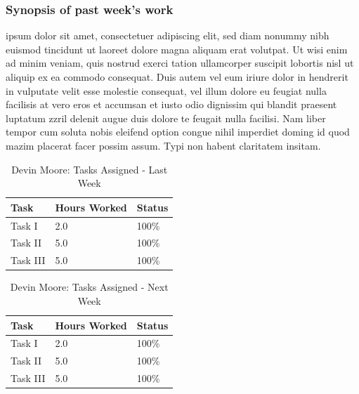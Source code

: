 \documentclass[12pt,journal]{IEEEtran}
\begin{document}
	\subsubsection*{Synopsis of past week's work}
	ipsum dolor sit amet, consectetuer adipiscing elit, sed diam nonummy nibh 
	euismod tincidunt ut laoreet dolore magna aliquam erat volutpat. Ut wisi enim ad minim veniam, quis 
	nostrud exerci tation ullamcorper suscipit lobortis nisl ut aliquip ex ea commodo consequat. Duis 
	autem vel eum iriure dolor in hendrerit in vulputate velit esse molestie consequat, vel illum dolore 
	eu feugiat nulla facilisis at vero eros et accumsan et iusto odio dignissim qui blandit praesent luptatum 
	zzril delenit augue duis dolore te feugait nulla facilisi. Nam liber tempor cum soluta nobis eleifend option 
	congue nihil imperdiet doming id quod mazim placerat facer possim assum. Typi non habent claritatem insitam.

	\begin{table}[H]
	\renewcommand{\arraystretch}{1.3}
		\caption{Devin Moore: Tasks Assigned - Last Week}
		\label{Summary of Devin Moore's activities: last week}
		\centering
		\begin{tabular}{p{5cm}|p{1cm}|p{1cm}}

		\hline
		\bfseries 	Task		 		                    & \bfseries Hours Worked	& \bfseries Status	\\
		\hline\hline
					      Task I 					 	            			& 2.0                   	& 100\%             \\
                Task II 														& 5.0                   	& 100\%             \\
                Task III														& 5.0                   	& 100\%             \\

		\hline
		\end{tabular}
	\end{table}

	\begin{table}[H]
	\renewcommand{\arraystretch}{1.3}
		\caption{Devin Moore: Tasks Assigned - Next Week}
		\label{Summary of Devin Moore's activites: this week}
		\centering
		\begin{tabular}{p{5cm}|p{1cm}|p{1cm}}

		\hline
		\bfseries 	Task		 		            	& \bfseries Hours Worked	& \bfseries Status	\\
		\hline\hline
                Task I 					 	            			& 2.0                   	& 100\%             \\
                Task II 														& 5.0                   	& 100\%             \\
                Task III														& 5.0                   	& 100\%             \\
                    \hline
		\end{tabular}
	\end{table}
\end{document}
